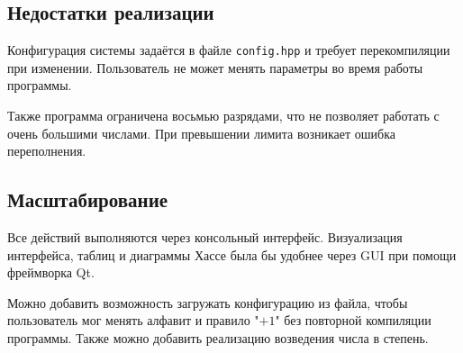\subsection*{Недостатки реализации}

Конфигурация системы задаётся в файле \texttt{config.hpp} и требует перекомпиляции при изменении. Пользователь не может менять параметры во время работы программы.

Также программа ограничена восьмью разрядами, что не позволяет работать с очень большими числами. При превышении лимита возникает ошибка переполнения. 

\subsection*{Масштабирование}

Все действий выполняются через консольный интерфейс.  Визуализация интерфейса, таблиц и диаграммы Хассе была бы удобнее  через GUI при помощи фреймворка Qt. 

Можно добавить возможность загружать конфигурацию из файла, чтобы пользователь мог менять алфавит и правило "$+1$" без повторной компиляции программы. Также можно добавить реализацию возведения числа в степень.